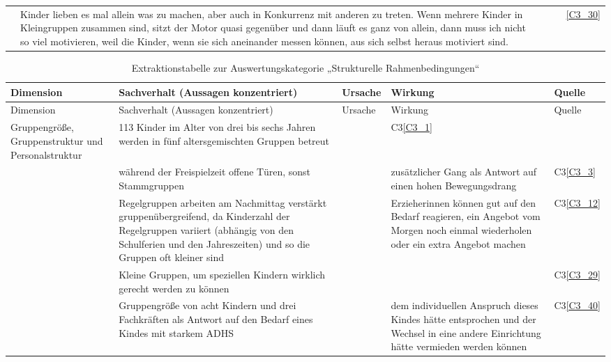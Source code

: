 \begin{landscape}
\begin{small}
\begin{centering}
\begin{longtable}{p{2cm}p{11cm}p{3cm}p{3cm}p{2cm}}
  & Kinder lieben es mal allein was zu machen, aber auch in Konkurrenz mit anderen zu treten. Wenn mehrere Kinder in Kleingruppen zusammen sind, sitzt der Motor quasi gegenüber und dann läuft es ganz von allein, dann muss ich nicht so viel motivieren, weil die Kinder, wenn sie sich aneinander messen können, aus sich selbst heraus motiviert sind.& & &\ref{C3_30}\\  
\end{longtable}
\end{centering} 
 
\begin{centering}
\begin{longtable}{p{2.2cm}p{8cm}p{6cm}p{3cm}p{2cm}} 
\caption{Extraktionstabelle zur Auswertungskategorie „Strukturelle Rahmenbedingungen“}\\
\toprule
Dimension & Sachverhalt (Aussagen konzentriert) & Ursache & Wirkung & Quelle\\
\midrule
\endfirsthead
\toprule
Dimension & Sachverhalt (Aussagen konzentriert) & Ursache & Wirkung & Quelle\\
\midrule
\endhead
\bottomrule
\endfoot
Gruppengröße, Gruppenstruktur und Personalstruktur & 113 Kinder im Alter von drei bis sechs Jahren werden in fünf altersgemischten Gruppen betreut  & & C3\ref{C3_1}\\

  & während der Freispielzeit offene Türen, sonst Stammgruppen &  &  zusätzlicher Gang als Antwort auf einen hohen Bewegungsdrang & C3\ref{C3_3}\\
  
 & Regelgruppen arbeiten am Nachmittag verstärkt gruppenübergreifend, da Kinderzahl der Regelgruppen variiert (abhängig von den Schulferien und den Jahreszeiten) und so die Gruppen oft kleiner sind & & Erzieherinnen können gut auf den Bedarf reagieren, ein Angebot vom Morgen noch einmal wiederholen oder ein extra Angebot machen & C3\ref{C3_12}\\
 
 & Kleine Gruppen, um speziellen Kindern wirklich gerecht werden zu können & & & C3\ref{C3_29}\\
  
 & Gruppengröße von acht Kindern und drei Fachkräften als Antwort auf den Bedarf eines Kindes mit starkem ADHS & & dem individuellen Anspruch dieses Kindes hätte entsprochen und der Wechsel in eine andere Einrichtung hätte vermieden werden können & C3\ref{C3_40}\\
 

\end{longtable}
\end{centering}
\end{small}
\end{landscape}
